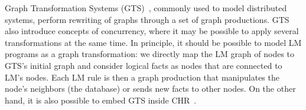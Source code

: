 Graph Transformation Systems (GTS)~\cite{Ehrig:2004vn}, commonly used to model
distributed systems, perform rewriting of graphs through a set of graph
productions. GTS also introduce concepts of concurrency, where it may be
possible to apply several transformations at the same time. In principle, it
should be possible to model LM programs as a graph transformation: we directly
map the LM graph of nodes to GTS's initial graph and consider logical facts as
nodes that are connected to LM's nodes. Each LM rule is then a graph production
that manipulates the node's neighbors (the database) or sends new facts to
other nodes. On the other hand, it is also possible to embed GTS inside
CHR~\cite{Raiser:2011:AGT:1972935.1972938}.
